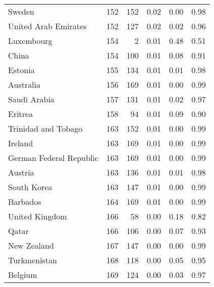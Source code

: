\begin{longtable}[t]{lrrrrr}
Sweden & 152 & 152 & 0.02 & 0.00 & 0.98\\
United Arab Emirates & 152 & 127 & 0.02 & 0.02 & 0.96\\
Luxembourg & 154 & 2 & 0.01 & 0.48 & 0.51\\
China & 154 & 100 & 0.01 & 0.08 & 0.91\\
Estonia & 155 & 134 & 0.01 & 0.01 & 0.98\\
\addlinespace
Australia & 156 & 169 & 0.01 & 0.00 & 0.99\\
Saudi Arabia & 157 & 131 & 0.01 & 0.02 & 0.97\\
Eritrea & 158 & 94 & 0.01 & 0.09 & 0.90\\
Trinidad and Tobago & 163 & 152 & 0.01 & 0.00 & 0.99\\
Ireland & 163 & 169 & 0.01 & 0.00 & 0.99\\
\addlinespace
German Federal Republic & 163 & 169 & 0.01 & 0.00 & 0.99\\
Austria & 163 & 136 & 0.01 & 0.01 & 0.98\\
South Korea & 163 & 147 & 0.01 & 0.00 & 0.99\\
Barbados & 164 & 169 & 0.01 & 0.00 & 0.99\\
United Kingdom & 166 & 58 & 0.00 & 0.18 & 0.82\\
\addlinespace
Qatar & 166 & 106 & 0.00 & 0.07 & 0.93\\
New Zealand & 167 & 147 & 0.00 & 0.00 & 0.99\\
Turkmenistan & 168 & 118 & 0.00 & 0.05 & 0.95\\
Belgium & 169 & 124 & 0.00 & 0.03 & 0.97\\
\bottomrule
\end{longtable}
